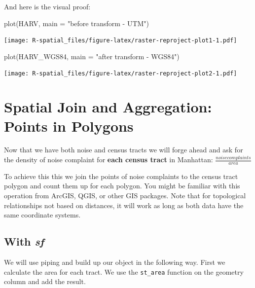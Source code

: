 \documentclass[
  11pt,
]{book}
\newenvironment{Shaded}{\begin{snugshade}}{\end{snugshade}}
\newcommand{\AttributeTok}[1]{\textcolor[rgb]{0.77,0.63,0.00}{#1}}
\newcommand{\FunctionTok}[1]{\textcolor[rgb]{0.00,0.00,0.00}{#1}}
\newcommand{\NormalTok}[1]{#1}
\newcommand{\StringTok}[1]{\textcolor[rgb]{0.31,0.60,0.02}{#1}}
\begin{document}
And here is the visual proof:

\begin{Shaded}
\begin{Highlighting}[]
\FunctionTok{plot}\NormalTok{(HARV, }\AttributeTok{main =} \StringTok{"before transform {-} UTM"}\NormalTok{)}
\end{Highlighting}
\end{Shaded}

\texttt{[image: R-spatial\_files/figure-latex/raster-reproject-plot1-1.pdf]}

\begin{Shaded}
\begin{Highlighting}[]
\FunctionTok{plot}\NormalTok{(HARV\_WGS84, }\AttributeTok{main =} \StringTok{"after transform {-} WGS84"}\NormalTok{)}
\end{Highlighting}
\end{Shaded}

\texttt{[image: R-spatial\_files/figure-latex/raster-reproject-plot2-1.pdf]}

\hypertarget{spatial-join-and-aggregation-points-in-polygons}{%
\section{Spatial Join and Aggregation: Points in Polygons}\label{spatial-join-and-aggregation-points-in-polygons}}

Now that we have both noise and census tracts we will forge ahead and ask for the density of noise complaint for \textbf{each census tract} in Manhattan: \(\frac{{noise complaints}}{area}\)

To achieve this this we join the points of noise complaints to the census tract polygon and count them up for each polygon. You might be familiar with this operation from ArcGIS, QGIS, or other GIS packages. Note that for topological relationships not based on distances, it will work as long as both data have the same coordinate systems.

\hypertarget{with-sf-1}{%
\subsection{\texorpdfstring{With \emph{sf}}{With sf}}\label{with-sf-1}}

We will use piping and build up our object in the following way. First we calculate the area for each tract. We use the \texttt{st\_area} function on the geometry column and add the result.
\end{document}
